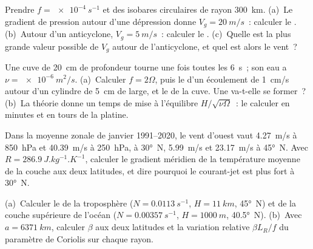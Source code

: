 \begin{exercise}[$\star\star$]\label{exo:b3:gfd-foundations:6}
Prendre $f = \qty{e-4}{s^{-1}}$ et des isobares circulaires de rayon
\qty{300}{km}. (a)~Le gradient de pression autour d'une dépression donne $V_g =
\qty{20}{m/s}$~: calculer le . (b)~Autour d'un anticyclone,
$V_g = \qty{5}{m/s}$~: calculer le . (c)~Quelle est la plus grande
valeur possible de $V_g$ autour de l'anticyclone, et quel est alors le vent~?
\end{exercise}

\begin{exercise}[$\star\star$]\label{exo:b3:gfd-foundations:7}
Une cuve de \qty{20}{cm} de profondeur tourne une fois toutes les \qty{6}{s}~; son eau a $\nu =
\qty{e-6}{m^2/s}$. (a)~Calculer $f = 2\Omega$, puis le 
d'un écoulement de \qty{1}{cm/s} autour d'un cylindre de \qty{5}{cm} de large, et le  de la cuve. Une  va-t-elle se former~? (b)~La théorie donne un temps de
mise à l'équilibre $H/\sqrt{\nu\Omega}$~: le calculer en minutes et en tours de la platine.
\end{exercise}

\begin{exercise}[$\star\star$]\label{exo:b3:gfd-foundations:8}
Dans la moyenne zonale de janvier 1991--2020, le vent d'ouest vaut \qty{4.27}{m/s}
à \qty{850}{hPa} et \qty{40.39}{m/s} à \qty{250}{hPa}, à \ang{30}~N,
\qty{5.99}{m/s} et \qty{23.17}{m/s} à \ang{45}~N. Avec $R =
\qty{286.9}{J.kg^{-1}.K^{-1}}$, calculer le gradient méridien de la
température moyenne de la couche aux deux latitudes, et dire pourquoi le courant-jet est plus fort
à \ang{30}~N.
\end{exercise}

\begin{exercise}[$\star\star$]\label{exo:b3:gfd-foundations:9}
(a)~Calculer le  de la troposphère ($N =
\qty{0.0113}{s^{-1}}$, $H = \qty{11}{km}$, \ang{45}~N) et de la couche supérieure
de l'océan ($N = \qty{0.00357}{s^{-1}}$, $H = \qty{1000}{m}$, \ang{40.5}~N).
(b)~Avec $a = \qty{6371}{km}$, calculer $\beta$ aux deux latitudes et la
variation relative $\beta L_R/f$ du paramètre de Coriolis sur chaque rayon.
\end{exercise}


